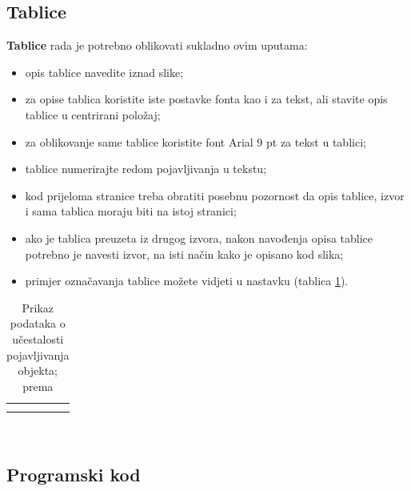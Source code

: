 \documentclass[]{foi}
\begin{document}
\subsection{Tablice}

\textbf{Tablice} rada je potrebno oblikovati sukladno ovim uputama:
\begin{itemize}
    \item opis tablice navedite iznad slike;

    \item za opise tablica koristite iste postavke fonta kao i za tekst, ali stavite opis tablice u centrirani položaj;

    \item za oblikovanje same tablice koristite font Arial 9 pt za tekst u tablici;

    \item tablice numerirajte redom pojavljivanja u tekstu;

    \item kod prijeloma stranice treba obratiti posebnu pozornost da opis tablice, izvor i sama tablica moraju biti na istoj stranici; 

    \item ako je tablica preuzeta iz drugog izvora, nakon navođenja opisa tablice potrebno je navesti izvor, na isti način kako je opisano kod slika;

    \item primjer označavanja tablice možete vidjeti u nastavku (tablica \ref{tab:objekti}).
\end{itemize}

\begin{table}[h!] 
    \centering
    \caption{Prikaz podataka o učestalosti pojavljivanja objekta; prema \cite{wooldridge2009IntroductionMultiAgentSystems}}
    \begin{tabularx}{0.66\textwidth}{|X|X|X|X|}
        \hline
         \cellcolor{gray!25} & \cellcolor{gray!25} & \cellcolor{gray!25} & \cellcolor{gray!25} \\
        \hline
         &  &  &  \\
        \hline
         &  &  & \\
        \hline
    \end{tabularx}
    \\[10pt]
    \label{tab:objekti}
\end{table}

\subsection{Programski kod}
\end{document}
